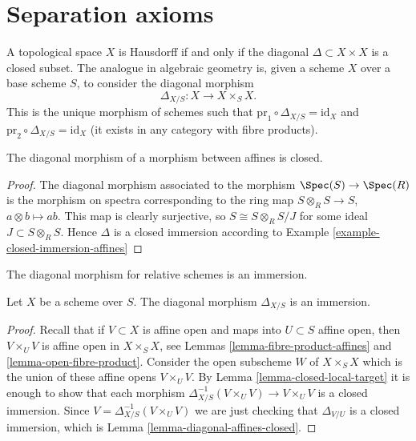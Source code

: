 \section{Separation axioms}
\label{section-separation-axioms}

\noindent
A topological space $X$ is Hausdorff if and only if the
diagonal $\Delta \subset X \times X$ is a closed subset.
The analogue in algebraic geometry is, given a scheme $X$ over
a base scheme $S$, to consider the
diagonal morphism
$$
\Delta_{X/S} : X \longrightarrow X \times_S X.
$$
This is the unique morphism of schemes such that
$\text{pr}_1 \circ \Delta_{X/S} = \text{id}_X$ and
$\text{pr}_2 \circ \Delta_{X/S} = \text{id}_X$ (it exists in
any category with fibre products).

\begin{lemma}
\label{lemma-diagonal-affines-closed}
The diagonal morphism of a morphism between affines is closed.
\end{lemma}

\begin{proof}
The diagonal morphism associated to the morphism
$\Spec(S) \to \Spec(R)$ is the morphism on spectra
corresponding to the ring
map $S \otimes_R S \to S$, $a \otimes b \mapsto ab$.
This map is clearly surjective, so $S \cong S \otimes_R S/J$
for some ideal $J \subset S \otimes_R S$. Hence
$\Delta$ is a closed immersion according to
Example \ref{example-closed-immersion-affines}
\end{proof}

\begin{lemma}
\label{lemma-diagonal-immersion}
\begin{slogan}
The diagonal morphism for relative schemes is an immersion.
\end{slogan}
Let $X$ be a scheme over $S$.
The diagonal morphism $\Delta_{X/S}$ is an immersion.
\end{lemma}

\begin{proof}
Recall that if $V \subset X$ is affine open and maps into
$U \subset S$ affine open, then $V \times_U V$ is affine open
in $X \times_S X$, see Lemmas \ref{lemma-fibre-product-affines}
and \ref{lemma-open-fibre-product}.
Consider the open subscheme $W$ of $X \times_S X$ which
is the union of these affine opens $V \times_U V$.
By Lemma \ref{lemma-closed-local-target} it is enough
to show that each morphism
$\Delta_{X/S}^{-1}(V \times_U V) \to V \times_U V$ is
a closed immersion. Since $V = \Delta_{X/S}^{-1}(V \times_U V)$
we are just checking that $\Delta_{V/U}$ is a closed
immersion, which is Lemma \ref{lemma-diagonal-affines-closed}.
\end{proof}

